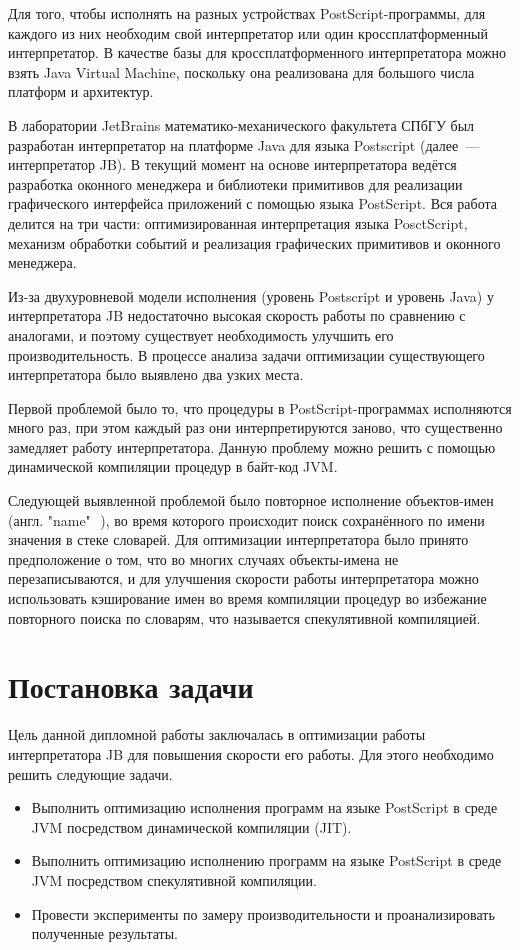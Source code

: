 	Для того, чтобы исполнять на разных устройствах PostScript-программы, для каждого из них необходим свой интерпретатор или один кроссплатформенный интерпретатор. В качестве базы для кроссплатформенного интерпретатора можно взять Java Virtual Machine, поскольку она реализована для большого числа платформ и архитектур.
	
	В лаборатории JetBrains математико-механического факультета СПбГУ был разработан интерпретатор на платформе Java для языка Postscript (далее~--- интерпретатор JB). В текущий момент на основе интерпретатора ведётся разработка оконного менеджера и библиотеки примитивов для реализации графического интерфейса приложений с помощью языка PostScript. Вся работа делится на три части: оптимизированная интерпретация языка PosctScript, механизм обработки событий и реализация графических примитивов и оконного менеджера.
	
	Из-за двухуровневой модели исполнения (уровень Postscript и уровень Java) у интерпретатора JB недостаточно высокая скорость работы по сравнению с  аналогами, и поэтому существует необходимость улучшить его производительность. В процессе анализа задачи оптимизации существующего интерпретатора было выявлено два узких места. 
	
	Первой проблемой было то, что процедуры в PostScript-программах исполняются много раз, при этом каждый раз они интерпретируются заново, что существенно замедляет работу интерпретатора. Данную проблему можно решить с помощью динамической компиляции процедур в байт-код JVM.
	
	Следующей выявленной проблемой было повторное исполнение объектов-имен (англ. "name"\,~\cite{PLRM}), во время которого происходит поиск сохранённого по имени значения в стеке словарей. Для оптимизации интерпретатора было принято предположение о том, что во многих случаях объекты-имена не перезаписываются, и для улучшения скорости работы интерпретатора можно использовать кэширование имен во время компиляции процедур во избежание повторного поиска по словарям, что называется спекулятивной компиляцией.
	\section{Постановка задачи} 
	Цель данной дипломной работы заключалась в оптимизации работы интерпретатора JB для повышения скорости его работы. Для этого необходимо решить следующие задачи.
	\begin{itemize}
		\item Выполнить оптимизацию исполнения программ на языке PostScript в среде JVM посредством динамической компиляции (JIT).
		\item Выполнить оптимизацию исполнению программ на языке PostScript в среде JVM посредством спекулятивной компиляции.	
		\item Провести эксперименты по замеру производительности и проанализировать полученные результаты. 
	\end{itemize}
	
